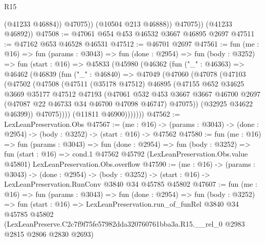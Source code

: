 \begin{lexlean}{R15}
\begin{coremodule}
                  (@41233 @46884))
                @47075))
            (@10504 @213 @46888))
          @47075))
      (@41233 @46892))
@47508 := @47061 @654 @453 @46532 @3667 @46895 @2697
@47511 := @47162 @653 @46528 @46531
@47512 := @46701 @2697
@47561 := fun (me : @16) =>
  fun (params : @3043) =>
  fun (done : @2954) =>
  fun (body : @3252) =>
  fun (start : @16) =>
  @45833
    (@45980
      (@46362
        (fun ("_" : @46363) =>
        @46462
          (@46839
            (fun ("_" : @46840) =>
            @47049
              (@47060
                (@47078
                  (@47103
                    (@47502
                      (@47508
                        (@47511
                          (@35178 @47512)
                          @46895
                          (@47155
                            @652
                            @34625
                            @3669
                            @35177
                            @47512
                            @47193
                            (@47061
                              @532
                              @453
                              @3667
                              @3667
                              @46700
                              @2697
                              (@47087 @22 @46733 @34 @46700 @47098 @46747)
                              @47075))
                          (@32925 @34622 @46399))
                        @47075))))
                (@11811 @46900)))))))
@47562 := LexLeanPreservation.Obs
@47567 := (me : @16) ->
  (params : @3043) -> (done : @2954) -> (body : @3252) -> (start : @16) -> @47562
@47580 := fun (me : @16) =>
  fun (params : @3043) =>
  fun (done : @2954) =>
  fun (body : @3252) =>
  fun (start : @16) =>
  cond.{1} @47562 @45792 (LexLeanPreservation.Obs.value @45801) LexLeanPreservation.Obs.overflow
@47590 := (me : @16) ->
  (params : @3043) ->
  (done : @2954) ->
  (body : @3252) -> (start : @16) -> LexLeanPreservation.RunConv @3840 @34 @45785 @45802
@47607 := fun (me : @16) =>
  fun (params : @3043) =>
  fun (done : @2954) =>
  fun (body : @3252) =>
  fun (start : @16) =>
  LexLeanPreservation.run_of_funRel
    @3840
    @34
    @45785
    @45802
    (LexLeanPreserve.C2c7f9f75fe57982dda320760761bba3a.R15.__rel_0 @2983 @2815 @2806 @2830 @2693)
\end{coremodule}
\end{lexlean}
